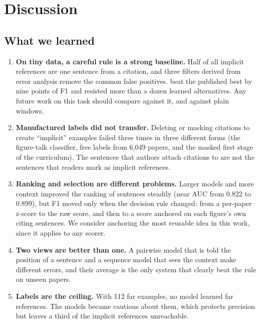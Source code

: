 \section{Discussion}
\label{sec:discussion}

\subsection{What we learned}
\begin{enumerate}
  \item \textbf{On tiny data, a careful rule is a strong baseline.} Half of all implicit references are one
        sentence from a citation, and three filters derived from error analysis remove the common false
        positives. \bof{} beat the published best by nine points of F1 and resisted more than a dozen learned
        alternatives. Any future work on this task should compare against it, and against plain windows.
  \item \textbf{Manufactured labels did not transfer.} Deleting or masking citations to create ``implicit''
        examples failed three times in three different forms (the figure-talk classifier, free labels from
        6{,}049 papers, and the masked first stage of the curriculum). The sentences that authors attach
        citations to are not the sentences that readers mark as implicit references.
  \item \textbf{Ranking and selection are different problems.} Larger models and more context improved the
        ranking of sentences steadily (near AUC from 0.822 to 0.899), but F1 moved only when the decision rule
        changed: from a per-paper z-score to the raw score, and then to a score anchored on each figure's own
        citing sentences. We consider anchoring the most reusable idea in this work, since it applies to any
        scorer.
  \item \textbf{Two views are better than one.} A pairwise model that is told the position of a sentence and a
        sequence model that sees the context make different errors, and their average is the only system
        that clearly beat the rule on unseen papers.
  \item \textbf{Labels are the ceiling.} With 112 far examples, no model learned far references. The models
        became cautious about them, which protects precision but leaves a third of the implicit references
        unreachable.
\end{enumerate}

